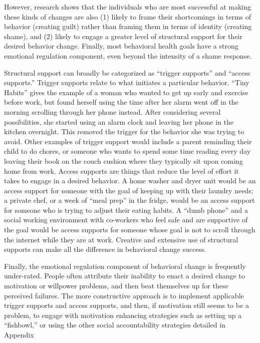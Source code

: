 \documentclass[12pt,letterpaper]{article}
\begin{document}
However, research shows that the individuals who are most successful at making these kinds of changes are also (1) likely to frame their shortcomings in terms of behavior (creating guilt) rather than framing them in terms of identity (creating shame), and (2) likely to engage a greater level of structural support for their desired behavior change. Finally, most behavioral health goals have a strong emotional regulation component, even beyond the intensity of a shame response.

Structural support can broadly be categorized as “trigger supports” and “access supports.” Trigger supports relate to what initiates a particular behavior. “Tiny Habits” gives the example of a woman who wanted to get up early and exercise before work, but found herself using the time after her alarm went off in the morning scrolling through her phone instead. After considering several possibilities, she started using an alarm clock and leaving her phone in the kitchen overnight. This removed the trigger for the behavior she was trying to avoid. Other examples of trigger support would include a parent reminding their child to do chores, or someone who wants to spend some time reading every day leaving their book on the couch cushion where they typically sit upon coming home from work. Access supports are things that reduce the level of effort it takes to engage in a desired behavior. A home washer and dryer unit would be an access support for someone with the goal of keeping up with their laundry needs; a private chef, or a week of “meal prep” in the fridge, would be an access support for someone who is trying to adjust their eating habits. A “dumb phone” and a social working environment with co-workers who feel safe and are supportive of the goal would be access supports for someone whose goal is not to scroll through the internet while they are at work. Creative and extensive use of structural supports can make all the difference in behavioral change success.

Finally, the emotional regulation component of behavioral change is frequently under-rated. People often attribute their inability to enact a desired change to motivation or willpower problems, and then beat themselves up for these perceived failures. The more constructive approach is to implement applicable trigger supports and access supports, and then, if motivation still seems to be a problem, to engage with motivation enhancing strategies such as setting up a “fishbowl,” or using the other social accountability strategies detailed in Appendix \todo{}
\end{document}
